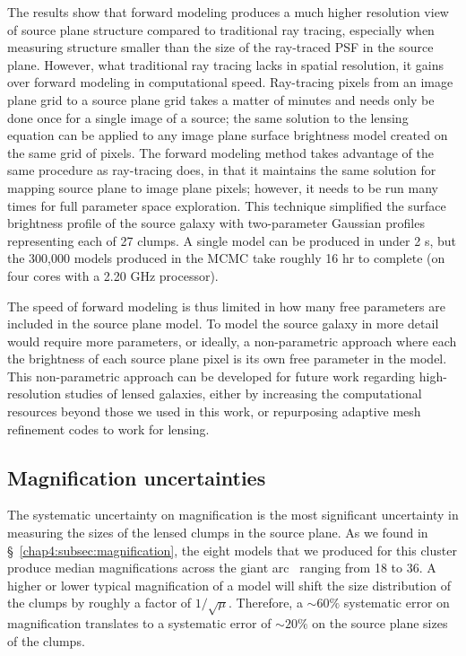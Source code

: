 The results show that forward modeling produces a much higher resolution view of source plane structure compared to traditional ray tracing, especially when measuring structure smaller than the size of the ray-traced PSF in the source plane. However, what traditional ray tracing lacks in spatial resolution, it gains over forward modeling in computational speed. Ray-tracing pixels from an image plane grid to a source plane grid takes a matter of minutes and needs only be done once for a single image of a source; the same solution to the lensing equation can be applied to any image plane surface brightness model created on the same grid of pixels. The forward modeling method takes advantage of the same procedure as ray-tracing does, in that it maintains the same solution for mapping source plane to image plane pixels; however, it needs to be run many times for full parameter space exploration. This technique simplified the surface brightness profile of the source galaxy with two-parameter Gaussian profiles representing each of 27 clumps. A single model can be produced in under 2 s, but the 300,000 models produced in the MCMC take roughly 16 hr to complete (on four cores with a 2.20 GHz processor).

The speed of forward modeling is thus limited in how many free parameters are included in the source plane model. To model the source galaxy in more detail would require more parameters, or ideally, a non-parametric approach where each the brightness of each source plane pixel is its own free parameter in the model. This non-parametric approach can be developed for future work regarding high-resolution studies of lensed galaxies, either by increasing the computational resources beyond those we used in this work, or repurposing adaptive mesh refinement codes to work for lensing.

\subsection{Magnification uncertainties}
The systematic uncertainty on magnification is the most significant uncertainty in measuring the sizes of the lensed clumps in the source plane. As we found in \S~\ref{chap4:subsec:magnification}, the eight models that we produced for this cluster produce median magnifications across the giant arc \giantarc\ ranging from 18 to 36. A higher or lower typical magnification of a model will shift the size distribution of the clumps by roughly a factor of $1/\sqrt{\mu}$. Therefore, a $\sim60\%$ systematic error on magnification translates to a systematic error of $\sim20\%$ on the source plane sizes of the clumps.

